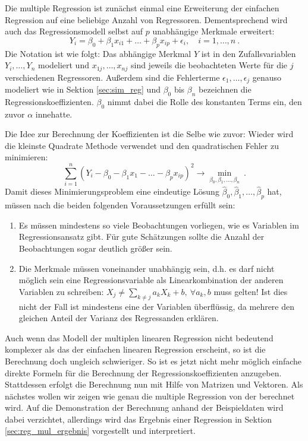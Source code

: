 Die multiple Regression ist zunächst einmal eine Erweiterung der einfachen Regression auf eine beliebige Anzahl von Regressoren.
Dementsprechend wird auch das Regressionsmodell selbst auf $p$ unabhängige Merkmale erweitert:
\begin{equation*}
  Y_i = \beta_0 + \beta_1 x_{i1} + \dots + \beta_p x_{ip} + \epsilon_i, \quad i = 1, \dots, n ~.
\end{equation*}
Die Notation ist wie folgt:
Das abhängige Merkmal $Y$ ist in den Zufallsvariablen $Y_i, \dots, Y_n$ modeliert und $x_{1j}, \dots, x_{nj}$ sind jeweils die beobachteten Werte für die $j$ verschiedenen Regressoren.
Außerdem sind die Fehlerterme $\epsilon_1, \dots, \epsilon_j$ genauso modeliert wie in Sektion \ref{sec:sim_reg} und $\beta_0$ bis $\beta_n$ bezeichnen die Regressionskoeffizienten.
$\beta_0$ nimmt dabei die Rolle des konstanten Terms ein, den zuvor $\alpha$ innehatte.

Die Idee zur Berechnung der Koeffizienten ist die Selbe wie zuvor:
Wieder wird die kleinste Quadrate Methode verwendet und den quadratischen Fehler zu minimieren:
\begin{equation*}
  \label{eq:kq_mul}
  \sum\limits_{i=1}^{n} (Y_i - \beta_0 -\beta_1 x_1 - \dots - \beta_p x_{ip})^2 \rightarrow \min\limits_{\beta_0,\beta_1,\dots,\beta_n} ~.
\end{equation*}
Damit dieses Minimierungsproblem eine eindeutige Lösung $\hat\beta_0, \hat\beta_1, \dots, \hat\beta_p$ hat, müssen nach \citep[S.496]{Fahrmeir2010} die beiden folgenden Voraussetzungen erfüllt sein:
\begin{enumerate}
  \item Es müssen mindestens so viele Beobachtungen vorliegen, wie es Variablen im Regressionsansatz gibt. 
    Für gute Schätzungen sollte die Anzahl der Beobachtungen sogar deutlich größer sein.
  \item Die Merkmale müssen voneinander unabhängig sein, d.h. es darf nicht möglich sein eine Regressionsvariable als Linearkombination der anderen Variablen zu schreiben: $X_j \neq \sum\limits_{k\neq j} a_k X_k + b,~ \forall a_k, b$ muss gelten!
    Ist dies nicht der Fall ist mindestens eine der Variablen überflüssig, da mehrere den gleichen Anteil der Varianz des Regressanden erklären.  
\end{enumerate}

Auch wenn das Modell der multiplen linearen Regression nicht bedeutend komplexer als das der einfachen linearen Regression erscheint, so ist die Berechnung doch ungleich schwieriger.
So ist es jetzt nicht mehr möglich einfache direkte Formeln für die Berechnung der Regressionskoeffizienten anzugeben.
Stattdessen erfolgt die Berechnung nun mit Hilfe von Matrizen und Vektoren.
Als nächstes wollen wir zeigen wie genau die multiple Regression von der \naglib berechnet wird.
Auf die Demonstration der Berechnung anhand der Beispieldaten wird dabei verzichtet, allerdings wird das Ergebnis einer Regression in Sektion \ref{sec:reg_mul_ergebnis} vorgestellt und interpretiert.

